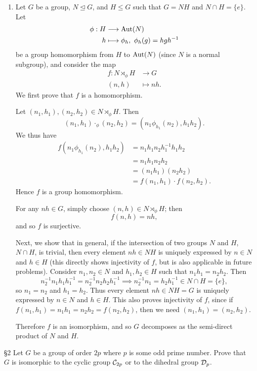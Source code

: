 \documentclass{homework}
\begin{document}
\begin{solution}
\begin{enumerate}[label=(\alph*)]
    \item Let $G$ be a group, $N\unlhd G$, and $H\le G$ such that $G=NH$ and $N \cap H=\{ e \}$. Let
      \begin{align*}
        \phi: H &\longrightarrow \operatorname{Aut}(N) \\
        h &\longmapsto \phi_h,\ \phi_h(g)=hgh^{-1}
        \end{align*} be a group homomorphism from $H$ to $\operatorname{Aut}(N)$ (since $N$ is a normal subgroup),
        and consider the map \begin{align*}
        f: N\rtimes_\phi H &\longrightarrow G \\
        (n,h) &\longmapsto nh
      .\end{align*} We first prove that $f$ is a homomorphism.

      Let $(n_1,h_1),(n_2,h_2)\in N\rtimes_\phi H$. Then \[
        (n_1,h_1)\cdot _\phi(n_2,h_2)=(n_1\phi_{h_1}(n_2),h_1h_2)
      .\] We thus have
      \begin{align*}
        f(n_1\phi_{h_1}(n_2),h_1h_2)&= n_1h_1n_2h_1^{-1}h_1h_2 \\
                                    &= n_1h_1n_2h_2 \\
                                    &= (n_1h_1)(n_2h_2)\\
                                    &= f(n_1,h_1)\cdot f(n_2,h_2)
      .\end{align*} Hence $f$ is a group homomorphism.

      For any $nh\in G$, simply choose $(n,h)\in N\rtimes_\phi H$; then \[
        f(n,h)=nh
      ,\] and so $f$ is surjective.

      Next, we show that in general, if the intersection of two groups $N$ and $H$, $N \cap H$, is
      trivial, then every element $nh\in NH$ is uniquely expressed by $n\in N$ and $h\in H$ (this
      directly shows injectivity of $f$, but is also applicable in future problems). Consider
      $n_1,n_2\in N$ and $h_1,h_2\in H$ such that $n_1h_1=n_2h_2$. Then \[
        n_2^{-1}n_1h_1h_1^{-1}=n_2^{-1}n_2h_2h_1^{-1}\implies n_2^{-1}n_1=h_2h_1^{-1}\in N \cap H=\{
        e\}
      ,\] so $n_1=n_2$ and $h_1=h_2$. Thus every element $nh\in NH=G$ is uniquely expressed by $n\in
      N$ and $h\in H$. This also proves injectivity of $f$, since if
      $f(n_1,h_1)=n_1h_1=n_2h_2=f(n_2,h_2)$, then we need $(n_1,h_1)=(n_2,h_2)$.

      Therefore $f$ is an isomorphism, and so $G$ decomposes as the semi-direct product of $N$ and
      $H$.
  \end{enumerate}
\end{solution}
\begin{problem}{\S 2}
  Let $G$ be a group of order $2p$ where $p$ is some odd prime number. Prove that $G$ is isomorphic
  to the cyclic group $\mathcal{C}_{2p}$ or to the dihedral group $\mathcal{D}_p$.
\end{problem}
\end{document}
